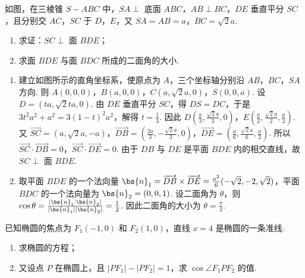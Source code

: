 \documentclass[UTF8,a4paper,oneside,11pt]{ctexbook}
\begin{document}
\begin{problem}
如图，在三棱锥 \(S-ABC\) 中，\(SA\perp\) 底面 \(ABC\)，\(AB\perp BC\)，\(DE\) 垂直平分 \(SC\)，且分别交 \(AC\)，\(SC\) 于 \(D\)，\(E\)，又 \(SA=AB=a\)，\(BC=\sqrt{2}a\).

\begin{enumerate}
\item 求证：\(SC\perp\) 面 \(BDE\)；
\item 求面 \(BDE\) 与面 \(BDC\) 所成的二面角的大小.
\end{enumerate}

\end{problem}

\begin{solution}
\begin{enumerate}
\item 建立如图所示的直角坐标系，使原点为 \(A\)，三个坐标轴分别沿 \(AB\)，\(BC\)，\(SA\) 方向. 则 \(A(0,0,0)\)，\(B(a,0,0)\)，\(C(a,\sqrt{2}a,0)\)，\(S(0,0,a)\). 设 \(D=(ta,\sqrt{2}ta,0)\). 由 \(DE\) 垂直平分 \(SC\)，得 \(DS=DC\)，于是 \(3t^2a^2+a^2=3(1-t)^2a^2\)，解得 \(t=\frac13\). 因此 \(D\left(\frac a3,\frac{\sqrt{2}a}{3},0\right)\)，\(E\left(\frac a2,\frac{\sqrt{2}a}{2},\frac a2\right)\). 又 \(\overrightarrow{SC}=(a,\sqrt{2}a,-a)\)，\(\overrightarrow{DB}=\left(\frac{2a}{3},-\frac{\sqrt{2}a}{3},0\right)\)，\(\overrightarrow{DE}=\left(\frac a6,\frac{\sqrt{2}a}{6},\frac a2\right)\). 所以 \(\overrightarrow{SC}\cdot\overrightarrow{DB}=0\)，\(\overrightarrow{SC}\cdot\overrightarrow{DE}=0\).
由于 \(DB\) 与 \(DE\) 是平面 \(BDE\) 内的相交直线，故 \(SC\perp\) 面 \(BDE\).

\item 取平面 \(BDE\) 的一个法向量 \(\bs{n}_1=\overrightarrow{DB}\times\overrightarrow{DE}=\frac{a^2}{6}(-\sqrt{2},-2,\sqrt{2})\)，平面 \(BDC\) 的一个法向量为 \(\bs{n}_2=(0,0,1)\). 设二面角为 \(\theta\)，则 \(\cos\theta=\frac{|\bs{n}_1\cdot\bs{n}_2|}{|\bs{n}_1||\bs{n}_2|}=\frac12\).
因此二面角的大小为 \(\theta=\frac{\pi}{3}\).
\end{enumerate}
\end{solution}

\begin{problem}
已知椭圆的焦点为 \(F_1(-1,0)\) 和 \(F_2(1,0)\)，直线 \(x=4\) 是椭圆的一条准线.

\begin{enumerate}
\item 求椭圆的方程；
\item 又设点 \(P\) 在椭圆上，且 \(\left| PF_1 \right|-\left| PF_2 \right|=1\)，求 \(\cos\angle F_1PF_2\) 的值.
\end{enumerate}
\end{problem}
\end{document}
